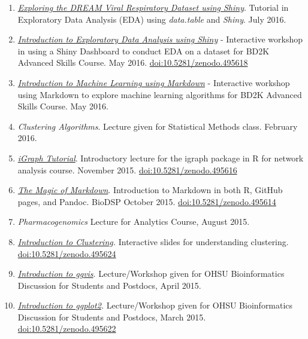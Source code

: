 \documentclass[11pt,]{article}
\begin{document}
\begin{enumerate}
\item
  \href{https://github.com/laderast/DreamEDAShiny}{\emph{Exploring the
  DREAM Viral Respiratory Dataset using Shiny}}. Tutorial in Exploratory
  Data Analysis (EDA) using \emph{data.table} and \emph{Shiny}. July
  2016.
\item
  \href{https://github.com/laderast/shinyEDA}{\emph{Introduction to
  Exploratory Data Analysis using Shiny}} - Interactive workshop in
  using a Shiny Dashboard to conduct EDA on a dataset for BD2K Advanced
  Skills Course. May 2016.
  \href{https://doi.org/10.5281/zenodo.495618}{doi:10.5281/zenodo.495618}
\item
  \href{https://github.com/laderast/MLtutorial}{\emph{Introduction to
  Machine Learning using Markdown}} - Interactive workshop using
  Markdown to explore machine learning algorithms for BD2K Advanced
  Skills Course. May 2016.
\item
  \emph{Clustering Algorithms}. Lecture given for Statistical Methods
  class. February 2016.
\item
  \href{https://github.com/laderast/igraphTutorial}{\emph{iGraph
  Tutorial}}. Introductory lecture for the igraph package in R for
  network analysis course. November 2015.
  \href{https://doi.org/10.5281/zenodo.495616}{doi:10.5281/zenodo.495616}
\item
  \href{https://github.com/laderast/magic-of-markdown}{\emph{The Magic
  of Markdown}}. Introduction to Markdown in both R, GitHub pages, and
  Pandoc. BioDSP October 2015.
  \href{https://doi.org/10.5281/zenodo.495614}{doi:10.5281/zenodo.495614}
\item
  \emph{Pharmacogenomics} Lecture for Analytics Course, August 2015.
\item
  \href{http://church.ohsu.edu:3838/laderast/clusteringLecture/}{\emph{Introduction
  to Clustering}}\emph{.} Interactive slides for understanding
  clustering.
  \href{https://doi.org/10.5281/zenodo.495624}{doi:10.5281/zenodo.495624}
\item
  \href{https://www.dropbox.com/s/n0unpdkd5r2tdu7/ggvis-Tutorial.html?dl=0}{\emph{Introduction
  to ggvis}}. Lecture/Workshop given for OHSU Bioinformatics Discussion
  for Students and Postdocs, April 2015.
\item
  \href{https://www.dropbox.com/s/efbwx3jjx89folh/ggplot2Intro.html?dl=0}{\emph{Introduction
  to ggplot2}}\emph{.} Lecture/Workshop given for OHSU Bioinformatics
  Discussion for Students and Postdocs, March 2015.
  \href{https://doi.org/10.5281/zenodo.495622}{doi:10.5281/zenodo.495622}

\end{enumerate}
\end{document}
